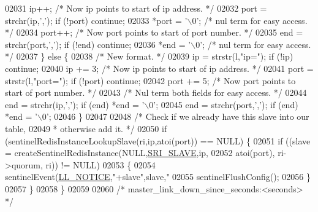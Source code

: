 \begin{DoxyCode}
{{{{{{{{{{{{{{{{{{{{{{{{{{{{{{{{{{{{{{{{02031                 ip++; \textcolor{comment}{/* Now ip points to start of ip address. */}
02032                 port = strchr(ip,\textcolor{stringliteral}{','}); \textcolor{keywordflow}{if} (!port) \textcolor{keywordflow}{continue};
02033                 *port = \textcolor{stringliteral}{'\(\backslash\)0'}; \textcolor{comment}{/* nul term for easy access. */}
02034                 port++; \textcolor{comment}{/* Now port points to start of port number. */}
02035                 end = strchr(port,\textcolor{stringliteral}{','}); \textcolor{keywordflow}{if} (!end) \textcolor{keywordflow}{continue};
02036                 *end = \textcolor{stringliteral}{'\(\backslash\)0'}; \textcolor{comment}{/* nul term for easy access. */}
02037             \} \textcolor{keywordflow}{else} \{
02038                 \textcolor{comment}{/* New format. */}
02039                 ip = strstr(l,\textcolor{stringliteral}{"ip="}); \textcolor{keywordflow}{if} (!ip) \textcolor{keywordflow}{continue};
02040                 ip += 3; \textcolor{comment}{/* Now ip points to start of ip address. */}
02041                 port = strstr(l,\textcolor{stringliteral}{"port="}); \textcolor{keywordflow}{if} (!port) \textcolor{keywordflow}{continue};
02042                 port += 5; \textcolor{comment}{/* Now port points to start of port number. */}
02043                 \textcolor{comment}{/* Nul term both fields for easy access. */}
02044                 end = strchr(ip,\textcolor{stringliteral}{','}); \textcolor{keywordflow}{if} (end) *end = \textcolor{stringliteral}{'\(\backslash\)0'};
02045                 end = strchr(port,\textcolor{stringliteral}{','}); \textcolor{keywordflow}{if} (end) *end = \textcolor{stringliteral}{'\(\backslash\)0'};
02046             \}
02047 
02048             \textcolor{comment}{/* Check if we already have this slave into our table,}
02049 \textcolor{comment}{             * otherwise add it. */}
02050             \textcolor{keywordflow}{if} (sentinelRedisInstanceLookupSlave(ri,ip,atoi(port)) == NULL) \{
02051                 \textcolor{keywordflow}{if} ((slave = createSentinelRedisInstance(NULL,\hyperlink{sentinel_8c_a4b9db21eda79d49bd9fdf2cf7b3178e8}{SRI\_SLAVE},ip,
02052                             atoi(port), ri->quorum, ri)) != NULL)
02053                 \{
02054                     sentinelEvent(\hyperlink{server_8h_a8c54c191e436c7dd3012167212692401}{LL\_NOTICE},\textcolor{stringliteral}{"+slave"},slave,\textcolor{stringliteral}{"%
02055                     sentinelFlushConfig();
02056                 \}
02057             \}
02058         \}
02059 
02060         \textcolor{comment}{/* master\_link\_down\_since\_seconds:<seconds> */}
}}}}}}}}}}}}}}}}}}}}}}}}}}}}}}}}}}}}}}}}}
\end{DoxyCode}
